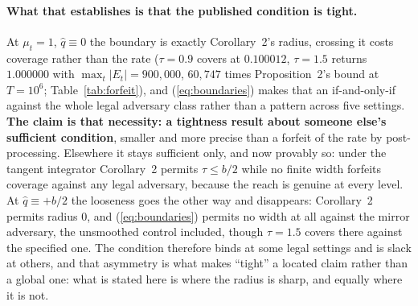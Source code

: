 
\paragraph{What that establishes is that the published condition is tight.} At $\mu_t = 1$,
$\hat{q} \equiv 0$ the boundary is exactly Corollary~2's radius, crossing it costs coverage rather
than the rate ($\tau = 0.9$ covers at $0.100012$, $\tau = 1.5$ returns $1.000000$ with
$\max_t|E_t| = 900{,}000$, $60{,}747$ times Proposition~2's bound at $T = 10^6$;
Table~\ref{tab:forfeit}), and (\ref{eq:boundaries}) makes that an
if-and-only-if against the whole legal adversary class rather than a pattern across five settings. \textbf{The claim is that necessity: a
tightness result about someone else's sufficient condition}, smaller and more precise than a
forfeit of the rate by post-processing. Elsewhere it stays sufficient only, and now provably so:
under the tangent integrator Corollary~2 permits $\tau \le b/2$ while no finite width forfeits
coverage against any legal adversary, because the reach is genuine at every level. At $\hat{q}
\equiv +b/2$ the looseness goes the other way and disappears: Corollary~2 permits radius $0$, and
(\ref{eq:boundaries}) permits no width at all against the mirror adversary, the unsmoothed control
included, though $\tau = 1.5$ covers there against the specified one. The condition therefore
binds at some legal settings and is slack at others, and that asymmetry is what
makes ``tight'' a located claim rather than a global one: what is stated here is where the radius
is sharp, and equally where it is not.

